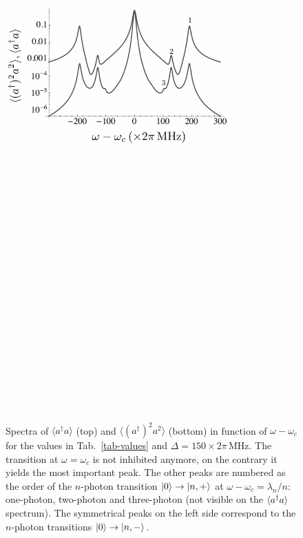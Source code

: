 \begin{figure}
\center
\includegraphics[width=0.75 \textwidth]{Images/chap5/spectrum150.pdf}
\caption[$\langle a^\dagger a \rangle$ and $\langle (a^\dagger)^2 a^2 \rangle$]{Spectra of $\langle a^\dagger a \rangle$ (top) and $\langle (a^\dagger)^2 a^2 \rangle$ (bottom) in function of  $\omega-\omega_c$ for the values in Tab.~\ref{tab-values} and $\Delta=150 \times 2\pi\,\mbox{MHz}$. The transition at $\omega=\omega_c$ is not inhibited anymore, on the contrary it yields the most important peak. The other peaks are numbered as the order of the $n$-photon transition $| 0 \rangle \rightarrow | n,+ \rangle$ at $\omega-\omega_c=\lambda_n/n$: one-photon, two-photon and three-photon (not visible on the $\langle a^\dagger a \rangle$ spectrum). The symmetrical peaks on the left side correspond to the $n$-photon transitions $| 0 \rangle \rightarrow | n,- \rangle$.}
\label{fig-spec150}
\end{figure}

